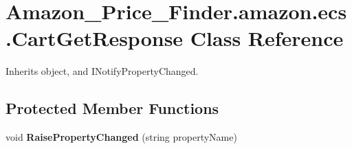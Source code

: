 \hypertarget{class_amazon___price___finder_1_1amazon_1_1ecs_1_1_cart_get_response}{\section{Amazon\-\_\-\-Price\-\_\-\-Finder.\-amazon.\-ecs.\-Cart\-Get\-Response Class Reference}
\label{class_amazon___price___finder_1_1amazon_1_1ecs_1_1_cart_get_response}
}


 




Inherits object, and I\-Notify\-Property\-Changed.

\subsection*{Protected Member Functions}
\begin{DoxyCompactItemize}
\item 
\hypertarget{class_amazon___price___finder_1_1amazon_1_1ecs_1_1_cart_get_response_a716c9a292858516b798109dbaecd954b}{void {\bfseries Raise\-Property\-Changed} (string property\-Name)}\label{class_amazon___price___finder_1_1amazon_1_1ecs_1_1_cart_get_response_a716c9a292858516b798109dbaecd954b}

\end{DoxyCompactItemize}
